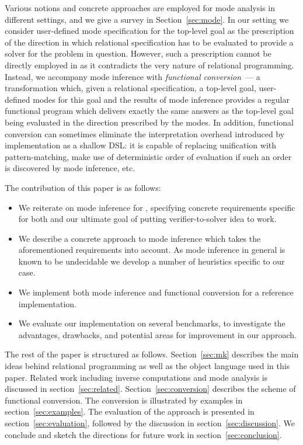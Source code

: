 Various notions and concrete approaches are employed for mode analysis in different settings, and we give a survey in Section~\ref{sec:mode}.
In our setting we consider user-defined mode specification for the top-level goal as the prescription of the direction in which relational specification has to be evaluated to provide a solver for the problem in question.
However, such a prescription cannot be directly employed in \mk as it contradicts the very nature of relational programming.
Instead, we accompany mode inference with \emph{functional conversion}~--- a transformation which, given a relational specification, a top-level goal, user-defined modes for this goal and the results of mode inference provides a regular functional program which delivers exactly the same answers as the top-level goal being evaluated in the direction prescribed by the modes.
In addition, functional conversion can sometimes eliminate the interpretation overhead introduced by \mk implementation as a shallow DSL: it is capable of replacing unification with pattern-matching, make use of deterministic order of evaluation if such an order is discovered by mode inference, etc.

The contribution of this paper is as follows:

\begin{itemize}
\item We reiterate on mode inference for \mk, specifying concrete requirements specific for both \mk and our ultimate goal of putting verifier-to-solver idea to work.
\item We describe a concrete approach to mode inference which takes the aforementioned requirements into account. As mode inference in general is known to be undecidable we   develop a number of heuristics specific to our case.
\item We implement both mode inference and functional conversion for a reference \mk implementation.
\item We evaluate our implementation on several benchmarks, to investigate the advantages, drawbacks, and potential areas for improvement in our approach.
\end{itemize}

The rest of the paper is structured as follows.
Section~\ref{sec:mk} describes the main ideas behind relational programming as well as the object language used in this paper.
Related work including inverse computations and mode analysis is discussed in section~\ref{sec:related}.
Section~\ref{sec:conversion} describes the scheme of functional conversion.
The conversion is illustrated by examples in section~\ref{sec:examples}.
The evaluation of the approach is presented in section~\ref{sec:evaluation}, followed by the discussion in section~\ref{sec:discussion}.
We conclude and sketch the directions for future work in section~\ref{sec:conclusion}.
